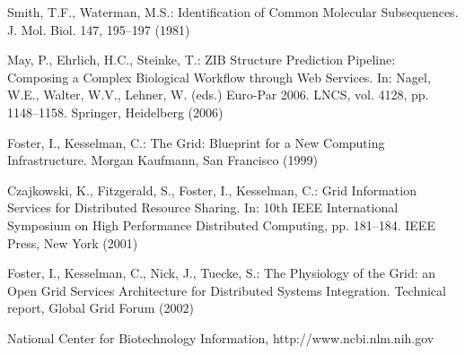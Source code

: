 \documentclass[lnbip]{svmultln}
\begin{document}
%
%
\begin{thebibliography}{5}

 Smith, T.F., Waterman, M.S.: Identification of Common Molecular
Subsequences. J. Mol. Biol. 147, 195--197 (1981)

 May, P., Ehrlich, H.C., Steinke, T.: ZIB Structure Prediction Pipeline:
Composing a Complex Biological Workflow through Web Services. In: Nagel,
W.E., Walter, W.V., Lehner, W. (eds.) Euro-Par 2006. LNCS, vol. 4128,
pp. 1148--1158. Springer, Heidelberg (2006)

 Foster, I., Kesselman, C.: The Grid: Blueprint for a New Computing
Infrastructure. Morgan Kaufmann, San Francisco (1999)

 Czajkowski, K., Fitzgerald, S., Foster, I., Kesselman, C.: Grid
Information Services for Distributed Resource Sharing. In: 10th IEEE
International Symposium on High Performance Distributed Computing, pp.
181--184. IEEE Press, New York (2001)

 Foster, I., Kesselman, C., Nick, J., Tuecke, S.: The Physiology of the
Grid: an Open Grid Services Architecture for Distributed Systems
Integration. Technical report, Global Grid Forum (2002)

 National Center for Biotechnology Information, http://www.ncbi.nlm.nih.gov

\end{thebibliography}
%
\end{document}

